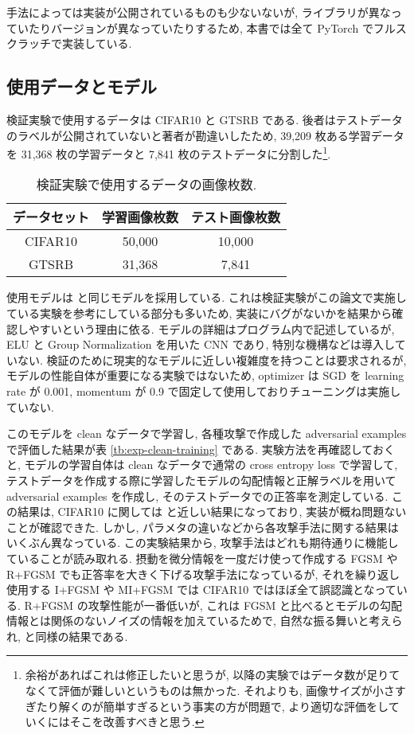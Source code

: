 手法によっては実装が公開されているものも少ないないが, ライブラリが異なっていたりバージョンが異なっていたりするため, 本書では全て PyTorch \cite{paszke2019pytorch} でフルスクラッチで実装している.



\subsection{使用データとモデル}
\label{subsec:data-and-model}
検証実験で使用するデータは CIFAR10 と GTSRB である.
後者はテストデータのラベルが公開されていないと著者が勘違いしたため, 39,209 枚ある学習データを 31,368 枚の学習データと 7,841 枚のテストデータに分割した\footnote{
余裕があればこれは修正したいと思うが, 以降の実験ではデータ数が足りてなくて評価が難しいというものは無かった.
それよりも, 画像サイズが小さすぎたり解くのが簡単すぎるという事実の方が問題で, より適切な評価をしていくにはそこを改善すべきと思う.
}.
%
\begin{table}[htbp]
\begin{center}
\begin{tabular}{|c|c|c|}
\hline
データセット & 学習画像枚数 & テスト画像枚数 \\
\hline
\hline
CIFAR10 & 50,000 & 10,000 \\
\hline
GTSRB & 31,368 & 7,841 \\
\hline
\end{tabular}
\caption{
検証実験で使用するデータの画像枚数.
}
\label{tb:data-num-image}
\end{center}
\end{table}
%

使用モデルは \cite{song2018improving} と同じモデルを採用している.
これは検証実験がこの論文で実施している実験を参考にしている部分も多いため, 実装にバグがないかを結果から確認しやすいという理由に依る.
モデルの詳細はプログラム内で記述しているが, ELU \cite{clevert2015fast} と Group Normalization \cite{wu2018group} を用いた CNN であり, 特別な機構などは導入していない.
検証のために現実的なモデルに近しい複雑度を持つことは要求されるが, モデルの性能自体が重要になる実験ではないため, optimizer は SGD を learning rate が 0.001, momentum が 0.9 で固定して使用しておりチューニングは実施していない.

このモデルを clean なデータで学習し, 各種攻撃で作成した adversarial examples で評価した結果が表 \ref{tb:exp-clean-training} である.
実験方法を再確認しておくと, モデルの学習自体は clean なデータで通常の cross entropy loss で学習して, テストデータを作成する際に学習したモデルの勾配情報と正解ラベルを用いて adversarial examples を作成し, そのテストデータでの正答率を測定している.
この結果は, CIFAR10 に関しては \cite{song2018improving} と近しい結果になっており, 実装が概ね問題ないことが確認できた.
しかし, パラメタの違いなどから各攻撃手法に関する結果はいくぶん異なっている.
この実験結果から, 攻撃手法はどれも期待通りに機能していることが読み取れる.
摂動を微分情報を一度だけ使って作成する FGSM や R+FGSM でも正答率を大きく下げる攻撃手法になっているが, それを繰り返し使用する I+FGSM や MI+FGSM では CIFAR10 ではほぼ全て誤認識となっている.
R+FGSM の攻撃性能が一番低いが, これは FGSM と比べるとモデルの勾配情報とは関係のないノイズの情報を加えているためで, 自然な振る舞いと考えられ, \cite{song2018improving} と同様の結果である.


